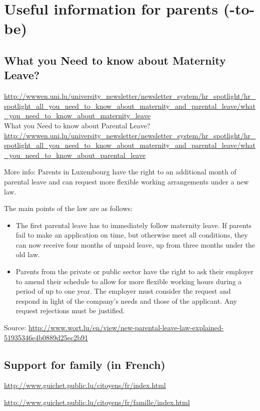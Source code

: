 \section{Useful information for parents (-to-be)}

\subsection{What you Need to know about Maternity Leave?}
\url{http://wwwen.uni.lu/university_newsletter/newsletter_system/hr_spotlight/hr_spotlight_all_you_need_to_know_about_maternity_and_parental_leave/what_you_need_to_know_about_maternity_leave}\\
What you Need to know about Parental Leave?\\
\url{http://wwwen.uni.lu/university_newsletter/newsletter_system/hr_spotlight/hr_spotlight_all_you_need_to_know_about_maternity_and_parental_leave/what_you_need_to_know_about_parental_leave}

More info:
Parents in Luxembourg have the right to an additional month of parental leave and can request more flexible working arrangements under a new law.
 
The main points of the law are as follows:
\begin{itemize}
	\item The first parental leave has to immediately follow maternity leave. If parents fail to make an application on time, but otherwise meet all conditions, they can now receive four months of unpaid leave, up from three months under the old law.
	\item Parents from the private or public sector have the right to ask their employer to amend their schedule to allow for more flexible working hours during a period of up to one year. The employer must consider the request and respond in light of the company's needs and those of the applicant. Any request rejections must be justified.
\end{itemize}

Source: \url{http://www.wort.lu/en/view/new-parental-leave-law-explained-51935346e4b0889d25ec2b91}
 
\subsection{Support for family (in French)}
\url{http://www.guichet.public.lu/citoyens/fr/index.html}
 
\url{http://www.guichet.public.lu/citoyens/fr/famille/index.html}
 
